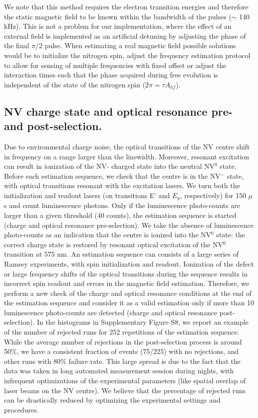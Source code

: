 \documentclass{report}
\begin{document}
We note that this method requires the electron transition energies and therefore the static magnetic field to be known within the bandwidth of the pulses ($\sim$ 140 kHz). This is not a problem for our implementation, where the effect of an external field is implemented as an artificial detuning by adjusting the phase of the final $\pi$/2 pulse. When estimating a real magnetic field possible solutions would be to initialize the nitrogen spin, adjust the frequency estimation protocol to allow for sensing of multiple frequencies with fixed offset or adjust the interaction times such that the phase acquired during free evolution is independent of the state of the nitrogen spin ($2 \pi = \tau A_{hf}$).

\subsection{NV charge state and optical resonance pre- and post-selection.}
Due to environmental charge noise, the optical transitions of the NV centre shift in frequency on a range larger than the linewidth. Moreover, resonant excitation can result in ionization of the NV- charged state into the neutral NV$^0$ state.
Before each estimation sequence, we check that the centre is in the NV$^-$ state, with optical transitions resonant with the excitation lasers. We turn both the initialization and readout lasers (on transitions E’ and $E_y$, respectively) for 150 $\mu$s and count luminescence photons. Only if the luminescence photo-counts are larger than a given threshold (40 counts), the estimation sequence is started (charge and optical resonance pre-selection). We take the absence of luminescence photo-counts as an indication that the centre is ionized into the NV$^0$ state: the correct charge state is restored by resonant optical excitation of the NV$^0$ transition at 575 nm.
An estimation sequence can consists of a large series of Ramsey experiments, with spin initialization and readout. Ionization of the defect or large frequency shifts of the optical transitions during the sequence results in incorrect spin readout and errors in the magnetic field estimation. Therefore, we perform a new check of the charge and optical resonance conditions at the end of the estimation sequence and consider it as a valid estimation only if more than 10 luminescence photo-counts are detected (charge and optical resonance post-selection).
In the histograms in Supplementary Figure S8, we report an example of the number of rejected runs for 252 repetitions of the estimation sequence. While the average number of rejections in the post-selection process is around 50\%, we have a consistent fraction of events (75/225) with no rejections, and other runs with 80\% failure rate. This large spread is due to the fact that the data was taken in long automated measurement session during nights, with infrequent optimizations of the experimental parameters (like spatial overlap of laser beams on the NV centre). We believe that the percentage of rejected runs can be drastically reduced by optimizing the experimental settings and procedures.
\end{document}
